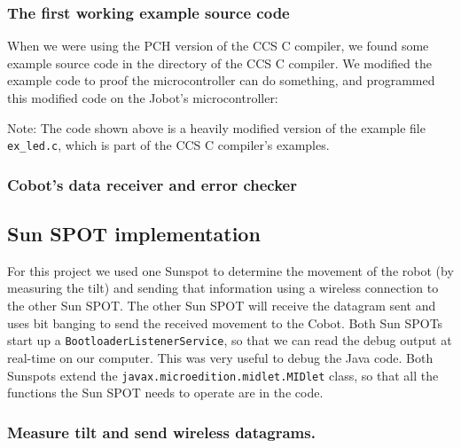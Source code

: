 \documentclass[a4paper,10pt]{article} %
\begin{document}
\subsubsection{The first working example source code} %
\label{ssub:The first working example source code}

When we were using the PCH version of the CCS C compiler, we found some example
source code in the directory of the CCS C compiler. We modified the example code
to proof the microcontroller can do something, and programmed this modified code
on the Jobot's microcontroller:



\noindent Note: The code shown above is a heavily modified version of the
example file \texttt{ex\_led.c}, which is part of the CCS C compiler's examples.


\subsubsection{Cobot's data receiver and error checker} %
\label{ssub:Cobot's data receiver and error checker}





\subsection{Sun SPOT implementation} %
\label{sub:Sun SPOT implementation}

For this project we used one Sunspot to determine the movement of the robot (by
measuring the tilt) and sending that information using a wireless connection to
the other Sun SPOT. The other Sun SPOT will receive the datagram sent and uses
bit banging to send the received movement to the Cobot. Both Sun SPOTs start up
a \texttt{BootloaderListenerService}, so that we can read the debug output at
real-time on our computer. This was very useful to debug the Java code. Both
Sunspots extend the \texttt{javax.microedition.midlet.MIDlet} class, so that all
the functions the Sun SPOT needs to operate are in the code.

\subsubsection{Measure tilt and send wireless datagrams.} %
\end{document}
